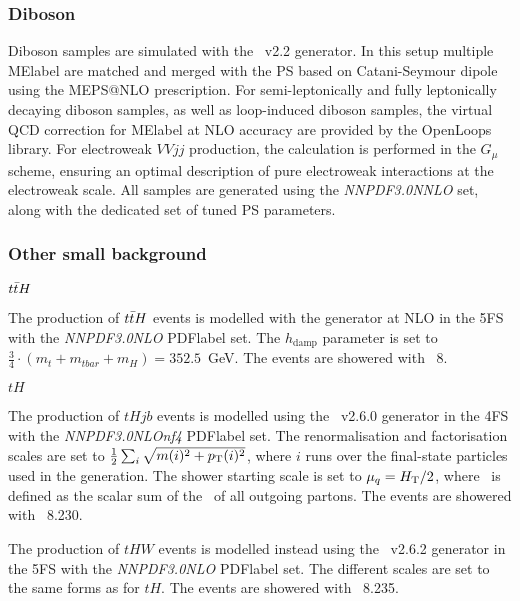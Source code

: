 \subsubsection{Diboson}
Diboson samples are simulated with the \SHERPA~v2.2 generator. In this setup multiple \acrshort{MElabel} are matched and merged with the \SHERPA PS based on Catani-Seymour dipole using the MEPS@NLO prescription. For semi-leptonically and fully leptonically decaying diboson samples, as well as loop-induced diboson samples, the virtual QCD correction for \acrshort{MElabel} at NLO accuracy are provided by the OpenLoops library. For electroweak $VVjj$ production, the calculation is performed in the $G_\mu$ scheme, ensuring an optimal description of pure electroweak interactions at the electroweak scale. All samples are generated using
the \textit{NNPDF3.0NNLO} set, along with the dedicated set of tuned PS parameters.

\subsubsection{Other small background}

\textit{$t\bar{t} H$}

The production of $t\bar{t} H$ events is modelled with the \POWHEGBOX generator at NLO in the 5FS with the \textit{NNPDF3.0NLO} \acrshort{PDFlabel} set. The $h_\text{damp}$ parameter is set to $\frac{3}{4}\cdot(m_t + m_{tbar} + m_H ) = 352.5$~GeV. The events are showered with \PYTHIA~8.%

\textit{$tH$}

The production of $tHjb$ events is modelled using the \MGMCatNLO~v2.6.0 generator in the 4FS with the \textit{NNPDF3.0NLOnf4} \acrshort{PDFlabel} set. The renormalisation and factorisation scales are set to $\frac{1}{2}\sum_i\sqrt{m(i)^2+p_{\text{T}}(i)^2}$, where $i$ runs over the final-state particles used in the generation. The shower starting scale is set to $\mu_q = H_{\text{T}} /2$, where \HT\ is defined as the scalar sum of the \pT\
of all outgoing partons. The events are showered with \PYTHIA~8.230.

The production of $tHW$ events is modelled instead using the \MGMCatNLO~v2.6.2 generator in the 5FS with the \textit{NNPDF3.0NLO} \acrshort{PDFlabel} set. The different scales are set to the same forms as for $tH$. The events are showered with \PYTHIA~8.235.

